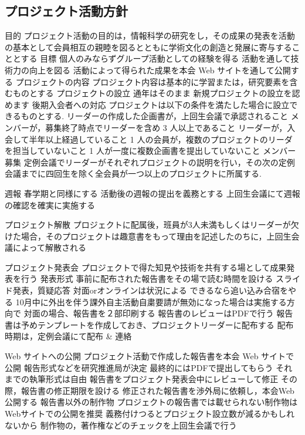\subsection*{プロジェクト活動方針}


目的
    プロジェクト活動の目的は，情報科学の研究をし，その成果の発表を活動の基本として会員相互の親睦を図るとともに学術文化の創造と発展に寄与することとする
目標
    個人のみならずグループ活動としての経験を得る
    活動を通して技術力の向上を図る
    活動によって得られた成果を本会 Web サイトを通して公開する
プロジェクトの内容
    プロジェクト内容は基本的に学習または，研究要素を含むものとする
プロジェクトの設立
    通年はそのまま
    新規プロジェクトの設立を認めます
    後期入会者への対応
    プロジェクトは以下の条件を満たした場合に設立できるものとする.
    リーダーの作成した企画書が，上回生会議で承認されること
    メンバーが，募集終了時点でリーダーを含め 3 人以上であること
    リーダーが，入会して半年以上経過していること
    1 人の会員が，複数のプロジェクトのリーダを担当していないこと
    1 人が一度に複数企画書を提出していないこと
メンバー募集
    定例会議でリーダーがそれぞれプロジェクトの説明を行い，その次の定例会議までに四回生を除く全会員が一つ以上のプロジェクトに所属する.

週報
    春学期と同様にする
    活動後の週報の提出を義務とする
    上回生会議にて週報の確認を確実に実施する
    
    
プロジェクト解散
    プロジェクトに配属後，班員が3人未満もしくはリーダーが欠けた場合，そのプロジェクトは趣意書をもって理由を記述したのちに，上回生会議によって解散される
    
プロジェクト発表会
    プロジェクトで得た知見や技術を共有する場として成果発表を行う
    発表形式
    事前に配布された報告書をその場で読む時間を設ける
    スライド発表，質疑応答
    対面orオンラインは状況による
    できるなら追い込み合宿をやる
    10月中に外出を伴う課外自主活動自粛要請が無効になった場合は実施する方向で
    対面の場合、報告書を２部印刷する
    報告書のレビューはPDFで行う
    報告書は予めテンプレートを作成しておき、プロジェクトリーダーに配布する
    配布時期は，定例会議にて配布 & 連絡
        
Web サイトへの公開
    プロジェクト活動で作成した報告書を本会 Web サイトで公開
    報告形式などを研究推進局が決定
    最終的にはPDFで提出してもらう
    それまでの執筆形式は自由
    報告書をプロジェクト発表会中にレビューして修正
    その際，報告書の修正期限を設ける
    修正された報告書を渉外局に依頼し，本会Web公開する
    報告書以外の制作物
    プロジェクトの報告書では載せられない制作物はWebサイトでの公開を推奨
    義務付けつるとプロジェクト設立数が減るかもしれないから
    制作物の，著作権などのチェックを上回生会議で行う
        
